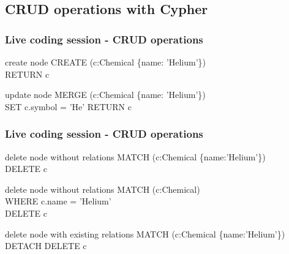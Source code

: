 \documentclass[12pt]{beamer}
\begin{document}
    \subsection{CRUD operations with Cypher}
    \begin{frame}
        \frametitle{Live coding session - CRUD operations}
        \begin{block}{create node}
            CREATE (c:Chemical \{name: 'Helium'\})\\ 
            \hspace{1cm} RETURN c
        \end{block}
        \begin{block}{update node}
            MERGE (c:Chemical \{name: 'Helium'\})\\
            \hspace{1cm} SET c.symbol = 'He' 
            \hspace{1cm} RETURN c
        \end{block}
    \end{frame}
    
    \begin{frame}
        \frametitle{Live coding session - CRUD operations}
        \begin{block}{delete node without relations}
            MATCH (c:Chemical \{name:'Helium'\})\\
            \hspace{1cm} DELETE c
        \end{block}
        \begin{block}{delete node without relations}
            MATCH (c:Chemical)\\
            \hspace{1cm} WHERE c.name = 'Helium'\\
            \hspace{1cm} DELETE c
        \end{block}
        \begin{block}{delete node with existing relations}
            MATCH (c:Chemical \{name:'Helium'\})\\
            \hspace{1cm} DETACH DELETE c\\
        \end{block}
    \end{frame}
    
\end{document}
